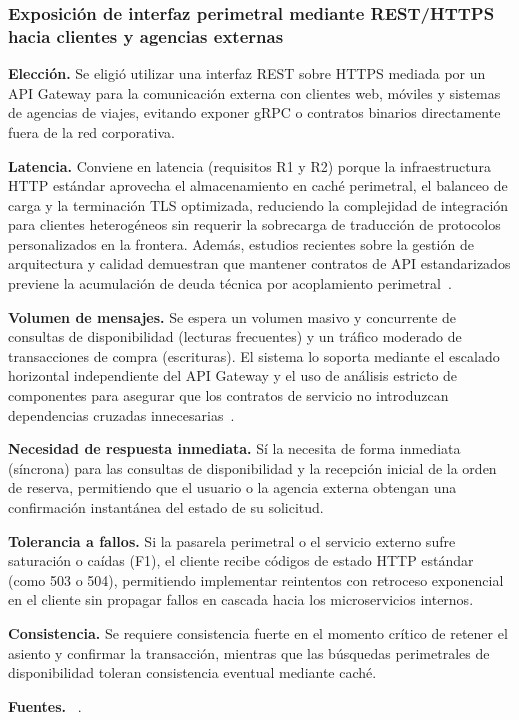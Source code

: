 \documentclass[11pt,a4paper]{article}
\newcommand{\decision}[8]{\subsubsection*{#1}%
  \textbf{Elección.} #2\par
  \textbf{Latencia.} #3\par
  \textbf{Volumen de mensajes.} #4\par
  \textbf{Necesidad de respuesta inmediata.} #5\par
  \textbf{Tolerancia a fallos.} #6\par
  \textbf{Consistencia.} #7\par
  \textbf{Fuentes.} #8\par}
\begin{document}
\decision{Exposición de interfaz perimetral mediante REST/HTTPS hacia clientes y agencias externas}
 {Se eligió utilizar una interfaz REST sobre HTTPS mediada por un API Gateway para la comunicación externa con clientes web, móviles y sistemas de agencias de viajes, evitando exponer gRPC o contratos binarios directamente fuera de la red corporativa.}
 {Conviene en latencia (requisitos R1 y R2) porque la infraestructura HTTP estándar aprovecha el almacenamiento en caché perimetral, el balanceo de carga y la terminación TLS optimizada, reduciendo la complejidad de integración para clientes heterogéneos sin requerir la sobrecarga de traducción de protocolos personalizados en la frontera. Además, estudios recientes sobre la gestión de arquitectura y calidad demuestran que mantener contratos de API estandarizados previene la acumulación de deuda técnica por acoplamiento perimetral~\cite{CERNY2023111829, DETOLEDO2021110968}.}
 {Se espera un volumen masivo y concurrente de consultas de disponibilidad (lecturas frecuentes) y un tráfico moderado de transacciones de compra (escrituras). El sistema lo soporta mediante el escalado horizontal independiente del API Gateway y el uso de análisis estricto de componentes para asegurar que los contratos de servicio no introduzcan dependencias cruzadas innecesarias~\cite{9737496}.}
 {Sí la necesita de forma inmediata (síncrona) para las consultas de disponibilidad y la recepción inicial de la orden de reserva, permitiendo que el usuario o la agencia externa obtengan una confirmación instantánea del estado de su solicitud.}
 {Si la pasarela perimetral o el servicio externo sufre saturación o caídas (F1), el cliente recibe códigos de estado HTTP estándar (como 503 o 504), permitiendo implementar reintentos con retroceso exponencial en el cliente sin propagar fallos en cascada hacia los microservicios internos.}
 {Se requiere consistencia fuerte en el momento crítico de retener el asiento y confirmar la transacción, mientras que las búsquedas perimetrales de disponibilidad toleran consistencia eventual mediante caché.}
 {~\cite{CERNY2023111829, DETOLEDO2021110968, 9737496}.}
\end{document}
